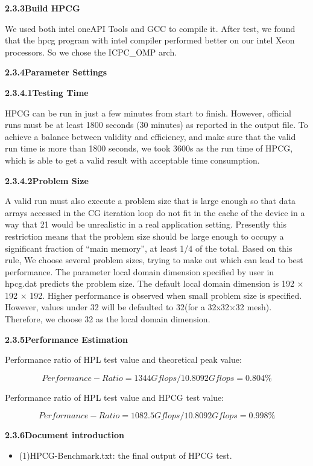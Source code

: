\documentclass[a4paper,12pt]{article}
\begin{document}
\textbf{2.3.3Build HPCG}

We used both intel oneAPI Tools and GCC to compile it. After test, we found that the hpcg program with intel compiler performed better on our intel Xeon processors. So we chose the ICPC\_OMP arch.

\textbf{2.3.4Parameter Settings}

\textbf{2.3.4.1Testing Time}

HPCG can be run in just a few minutes from start to finish. However, official runs must be at least 1800 seconds (30 minutes) as reported in the output file. To achieve a balance between validity and efficiency, and make sure that the valid run time is more than 1800 seconds, we took 3600s as the run time of HPCG, which is able to get a valid result with acceptable time consumption.

\textbf{2.3.4.2Problem Size}

A valid run must also execute a problem size that is large enough so that data arrays accessed in the CG iteration loop do not fit in the cache of the device in a way that 21 would be unrealistic in a real application setting. Presently this restriction means that the problem size should be large enough to occupy a significant fraction of “main memory”, at least 1/4 of the total. Based on this rule, We choose several problem sizes, trying to make out which can lead to best performance.
The parameter local domain dimension specified by user in hpcg.dat predicts the problem size. The default local domain dimension is 192 × 192 × 192. Higher performance is observed when small problem size is specified. However, values under 32 will be defaulted to 32(for a 32x32×32 mesh). Therefore, we choose 32 as the local domain dimension.

\textbf{2.3.5Performance Estimation}

Performance ratio of HPL test value and theoretical peak value:

\begin{equation*}
Performance-Ratio = 1344Gflops/10.8092Gflops = 0.804\%
\end{equation*}

Performance ratio of HPL test value and HPCG test value:

\begin{equation*}
Performance-Ratio = 1082.5Gflops/10.8092Gflops = 0.998\%
\end{equation*}

\textbf{2.3.6Document introduction}
\begin{itemize}
    \item (1)HPCG-Benchmark.txt: the final output of HPCG test.
\end{itemize}
\end{document}
